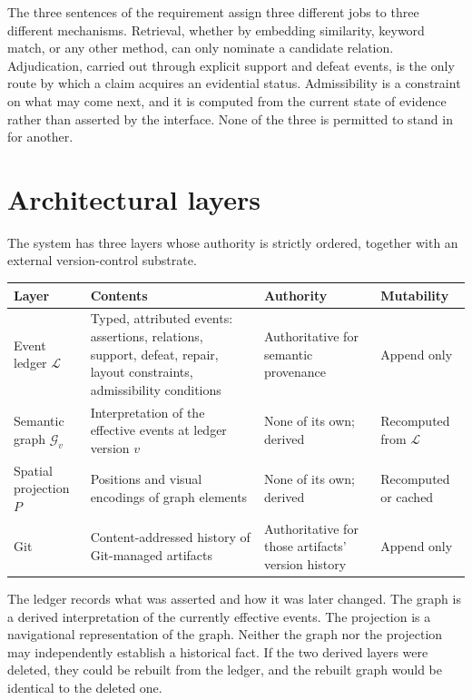 \documentclass[11pt]{article}
\theoremstyle{definition}
\newcommand{\Ledger}{\mathcal{L}}
\newcommand{\Graph}{\mathcal{G}}
\begin{document}
The three sentences of the requirement assign three different jobs to three different mechanisms. Retrieval, whether by embedding similarity, keyword match, or any other method, can only nominate a candidate relation. Adjudication, carried out through explicit support and defeat events, is the only route by which a claim acquires an evidential status. Admissibility is a constraint on what may come next, and it is computed from the current state of evidence rather than asserted by the interface. None of the three is permitted to stand in for another.

\section{Architectural layers}

The system has three layers whose authority is strictly ordered, together with an external version-control substrate.

\begin{table}[h]
\centering
\small
\begin{tabular}{@{}p{2.6cm}p{4.9cm}p{3.2cm}p{2.6cm}@{}}
\toprule
Layer & Contents & Authority & Mutability\\
\midrule
Event ledger $\Ledger$ & Typed, attributed events: assertions, relations, support, defeat, repair, layout constraints, admissibility conditions & Authoritative for semantic provenance & Append only\\
Semantic graph $\Graph_v$ & Interpretation of the effective events at ledger version $v$ & None of its own; derived & Recomputed from $\Ledger$\\
Spatial projection $P$ & Positions and visual encodings of graph elements & None of its own; derived & Recomputed or cached\\
Git & Content-addressed history of Git-managed artifacts & Authoritative for those artifacts' version history & Append only\\
\bottomrule
\end{tabular}
\end{table}

The ledger records what was asserted and how it was later changed. The graph is a derived interpretation of the currently effective events. The projection is a navigational representation of the graph. Neither the graph nor the projection may independently establish a historical fact. If the two derived layers were deleted, they could be rebuilt from the ledger, and the rebuilt graph would be identical to the deleted one.
\end{document}
